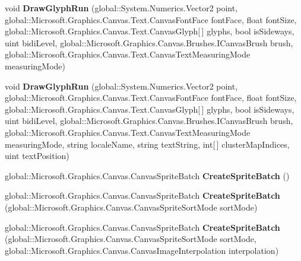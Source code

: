 \begin{DoxyCompactItemize}
void {\bfseries Draw\+Glyph\+Run} (global\+::\+System.\+Numerics.\+Vector2 point, global\+::\+Microsoft.\+Graphics.\+Canvas.\+Text.\+Canvas\+Font\+Face font\+Face, float font\+Size, global\+::\+Microsoft.\+Graphics.\+Canvas.\+Text.\+Canvas\+Glyph\mbox{[}$\,$\mbox{]} glyphs, bool is\+Sideways, uint bidi\+Level, global\+::\+Microsoft.\+Graphics.\+Canvas.\+Brushes.\+I\+Canvas\+Brush brush, global\+::\+Microsoft.\+Graphics.\+Canvas.\+Text.\+Canvas\+Text\+Measuring\+Mode measuring\+Mode)
\item 
\mbox{\label{interface_microsoft_1_1_graphics_1_1_canvas_1_1_i_canvas_drawing_session_ac04900ea603ac69768008def334d75c1}} 
void {\bfseries Draw\+Glyph\+Run} (global\+::\+System.\+Numerics.\+Vector2 point, global\+::\+Microsoft.\+Graphics.\+Canvas.\+Text.\+Canvas\+Font\+Face font\+Face, float font\+Size, global\+::\+Microsoft.\+Graphics.\+Canvas.\+Text.\+Canvas\+Glyph\mbox{[}$\,$\mbox{]} glyphs, bool is\+Sideways, uint bidi\+Level, global\+::\+Microsoft.\+Graphics.\+Canvas.\+Brushes.\+I\+Canvas\+Brush brush, global\+::\+Microsoft.\+Graphics.\+Canvas.\+Text.\+Canvas\+Text\+Measuring\+Mode measuring\+Mode, string locale\+Name, string text\+String, int\mbox{[}$\,$\mbox{]} cluster\+Map\+Indices, uint text\+Position)
\item 
\mbox{\label{interface_microsoft_1_1_graphics_1_1_canvas_1_1_i_canvas_drawing_session_ad594f5c3e77fa4d10f3ced9f28ef0b38}} 
global\+::\+Microsoft.\+Graphics.\+Canvas.\+Canvas\+Sprite\+Batch {\bfseries Create\+Sprite\+Batch} ()
\item 
\mbox{\label{interface_microsoft_1_1_graphics_1_1_canvas_1_1_i_canvas_drawing_session_adcd51e0a74eb1bd66142add48476976f}} 
global\+::\+Microsoft.\+Graphics.\+Canvas.\+Canvas\+Sprite\+Batch {\bfseries Create\+Sprite\+Batch} (global\+::\+Microsoft.\+Graphics.\+Canvas.\+Canvas\+Sprite\+Sort\+Mode sort\+Mode)
\item 
\mbox{\label{interface_microsoft_1_1_graphics_1_1_canvas_1_1_i_canvas_drawing_session_af90605df2ad07e7bbaed6f4357cee130}} 
global\+::\+Microsoft.\+Graphics.\+Canvas.\+Canvas\+Sprite\+Batch {\bfseries Create\+Sprite\+Batch} (global\+::\+Microsoft.\+Graphics.\+Canvas.\+Canvas\+Sprite\+Sort\+Mode sort\+Mode, global\+::\+Microsoft.\+Graphics.\+Canvas.\+Canvas\+Image\+Interpolation interpolation)

\end{DoxyCompactItemize}
